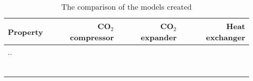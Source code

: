 \begin{table}
\label{tab:DiscussionComparison}
\caption{The comparison of the models created}
\begin{center}
\begin{tabulary}{0.9\textwidth}{LRRR}
\toprule
Property 	&	CO$_2$ compressor & CO$_2$	expander & Heat exchanger \\
\midrule
..& & & \\
& & & \\
& & & \\
& & & \\
& & & \\
& & & \\
& & & \\
\bottomrule
\end{tabulary}
\end{center}
\end{table}